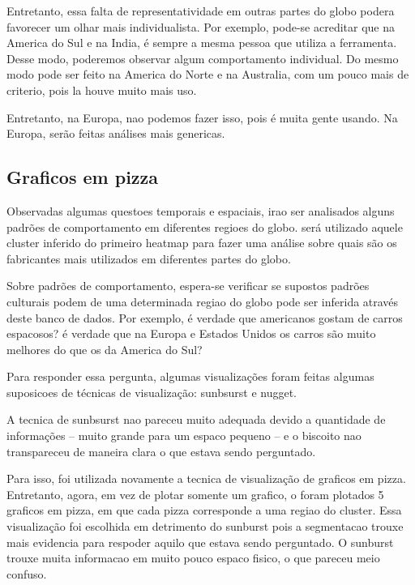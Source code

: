 \documentclass[10pt, conference]{IEEEtran}
\begin{document}
Entretanto, essa falta de representatividade em outras partes do globo podera favorecer um
olhar mais individualista. Por exemplo, pode-se acreditar que na America do Sul e na India,
é sempre a mesma pessoa que utiliza a ferramenta. Desse modo, poderemos observar algum
comportamento individual. Do mesmo modo pode ser feito na America do Norte e na Australia,
com um pouco mais de criterio, pois la houve muito mais uso.

Entretanto, na Europa, nao podemos fazer isso, pois é muita gente usando. Na Europa, serão
feitas análises mais genericas.




\subsection{Graficos em pizza}

Observadas algumas questoes temporais e espaciais, irao ser analisados alguns padrões de comportamento
em diferentes regioes do globo. será utilizado aquele cluster inferido do primeiro heatmap para
fazer uma análise sobre quais são os fabricantes mais utilizados em diferentes partes do globo.

Sobre padrões de comportamento, espera-se verificar se supostos padrões culturais podem de uma determinada
regiao do globo pode ser inferida através deste banco de dados. Por exemplo, é verdade que americanos
gostam de carros espacosos? é verdade que na Europa e Estados Unidos os carros são muito melhores
do que os da America do Sul?

Para responder essa pergunta, algumas visualizações foram feitas algumas suposicoes de técnicas
de visualização: sunbsurst e nugget. 

A tecnica de sunbsurst nao pareceu muito adequada devido a quantidade de informações -- muito grande para
um espaco pequeno -- e o biscoito nao transpareceu de maneira clara o que estava sendo perguntado.

Para isso, foi utilizada novamente a tecnica de visualização de graficos em pizza. Entretanto, agora,
em vez de plotar somente um grafico, o foram plotados 5 graficos em pizza, em que cada pizza corresponde
a uma regiao do cluster. Essa visualização foi escolhida em detrimento do sunburst pois a segmentacao
trouxe mais evidencia para respoder aquilo que estava sendo perguntado. O sunburst trouxe muita informacao
em muito pouco espaco fisico, o que pareceu meio confuso.
\end{document}
